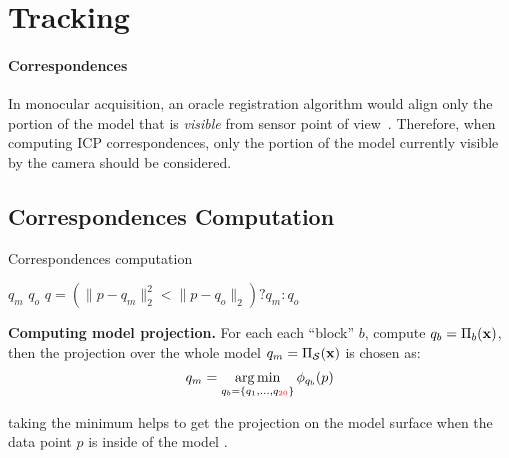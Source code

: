 \section{Tracking}

\paragraph{Correspondences}
In monocular acquisition, an oracle registration algorithm would align only the portion of the model that is \emph{visible} from sensor point of view~\cite{tagliasacchi2015robust}. Therefore, when computing ICP correspondences, only the portion of the model currently visible by the camera should be considered.







\subsection*{Correspondences Computation }

\begin{algorithm}
\caption{Correspondences computation }
\begin{algorithmic}[1]
    	 \State {} $q_m$
    	 \State {}
    	 \State {} $q_o$
         \State $q=(\|{p - q_m}\|_2^2 < \|{p - q_o}\|_2) ? q_m : q_o$
    \EndFor
\end{algorithmic}
\label{alg:correspondences}
\end{algorithm}

\textbf{Computing model projection.}
For each each ``block'' $b$, compute $q_b = \Pi_b(\mathbf{x})$, then the
projection over the whole model $q_m = \Pi_{\mathcal{S}}(\mathbf{x})$ is chosen as: 
\begin{equation*}
	q_m = \operatorname*{arg\,min}_{q_b = \{ q_1, \dots, q_{\textcolor{red}{20}} \}} \phi_{q_b}(p) 
\end{equation*}

taking the minimum helps to get the projection on the model surface when the data point $p$ is inside of the model .

